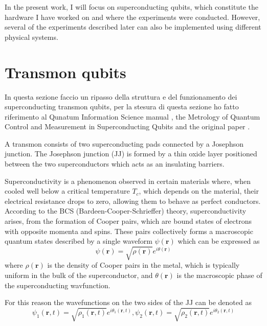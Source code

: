 In the present work, I will focus on superconducting qubits, which constitute the hardware I have worked on and where the experiments were conducted. 
However, several of the experiments described later can also be implemented using different physical systems.

\section{Transmon qubits}\label{sec:cQED}
In questa sezione faccio un ripasso della struttura e del funzionamento dei superconducting transmon qubits, per la stesura di questa sezione ho fatto riferimento al Qunatum Information Science manual \cite{manenti_quantum_2023}, the Metrology of Quantum Control and Measurement in Superconducting Qubits \cite{Chen2018} and the original paper \cite{TransmonPaper}.

A transmon consists of two superconducting pads connected by a Josephson junction. 
The Josephson junction (JJ) is formed by a thin oxide layer positioned between the two superconductors which acts as an insulating barriers. 

Superconductivity is a phenomenon observed in certain materials where, when cooled well below a critical temperature $T_c$, which depends on the material, their electrical resistance drops to zero, allowing them to behave as perfect conductors.
According to the BCS (Bardeen-Cooper-Schrieffer) theory, superconductivity arises, from the formation of Cooper pairs, which are bound states of electrons with opposite momenta and spins.
These pairs collectively forms a macroscopic quantum states described by a single waveform $\psi(\mathbf{r})$ which can be expressed as 
\begin{equation}\label{eq:BCSequation}
    \psi(\mathbf{r}) = \sqrt{\rho(\mathbf{r})}e^{i\theta(\mathbf{r})}
\end{equation}
where $\rho(\mathbf{r})$ is the density of Cooper pairs in the metal, which is typically uniform in the bulk of the superconductor, and $\theta(\mathbf{r})$ is the macroscopic phase of the superconducting wavfunction.

For this reason the wavefunctions on the two sides of the JJ can be denoted as
\begin{equation}\label{eq:JosephsonWavefunctions}
    \psi_1(\mathbf{r}, t) = \sqrt{\rho_1(\mathbf{r}, t)} e^{i\theta_1(\mathbf{r},t)}, \psi_2(\mathbf{r}, t) = \sqrt{\rho_2(\mathbf{r}, t)} e^{i\theta_2(\mathbf{r},t)}
\end{equation}

